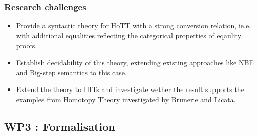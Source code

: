 \documentclass[twocolumn,a4paper,11pt]{article}
\renewcommand{\cite}[1]{{\tt[#1]}}
\begin{document}


\subsubsection*{Research challenges}
\label{sec:rsearch-challenges}

\begin{itemize}

\item Provide a syntactic theory for HoTT with a strong conversion
  relation, ie.e. with additional equalities reflecting the
  categorical properties of eqaulity proofs.

\item Establish decidability of this theory, extending existing
  approaches like NBE and Big-step semantics to this case.

\item Extend the theory to HITs and investigate wether the 
  result supports the examples from Homotopy Theory investigated by
  Brunerie and Licata.

\end{itemize}

\subsection*{WP3 : Formalisation} 
\end{document}
